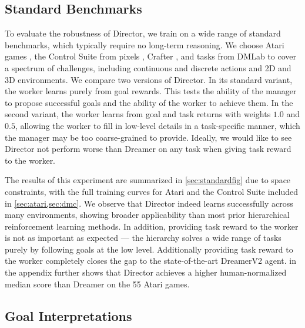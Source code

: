 \subsection{Standard Benchmarks}
\label{sec:standard}

To evaluate the robustness of Director, we train on a wide range of standard benchmarks, which typically require no long-term reasoning. 
We choose Atari games \citep{bellemare2013ale}, the Control Suite from pixels \citep{tassa2018dmcontrol}, Crafter \citep{hafner2021crafter}, and tasks from DMLab \citep{beattie2016dmlab} to cover a spectrum of challenges, including continuous and discrete actions and 2D and 3D environments. 
We compare two versions of Director. 
In its standard variant, the worker learns purely from goal rewards. 
This tests the ability of the manager to propose successful goals and the ability of the worker to achieve them. 
In the second variant, the worker learns from goal and task returns with weights $1.0$ and $0.5$, allowing the worker to fill in low-level details in a task-specific manner, which the manager may be too coarse-grained to provide. 
Ideally, we would like to see Director not perform worse than Dreamer on any task when giving task reward to the worker.

The results of this experiment are summarized in \cref{sec:standardfig} due to space constraints, with the full training curves for Atari and the Control Suite included in \cref{sec:atari,sec:dmc}.
We observe that Director indeed learns successfully across many environments, showing broader applicability than most prior hierarchical reinforcement learning methods. 
In addition, providing task reward to the worker is not as important as expected --- the hierarchy solves a wide range of tasks purely by following goals at the low level. 
Additionally providing task reward to the worker completely closes the gap to the state-of-the-art DreamerV2 agent.
 in the appendix further shows that Director achieves a higher human-normalized median score than Dreamer on the 55 Atari games.

\vspace*{3ex}
\pagebreak

\subsection{Goal Interpretations}
\label{sec:interp}

